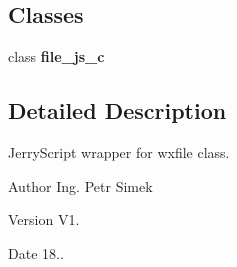 \subsection*{Classes}
\begin{DoxyCompactItemize}
\item 
class \textbf{ file\+\_\+js\+\_\+c}
\end{DoxyCompactItemize}


\subsection{Detailed Description}
Jerry\+Script wrapper for wxfile class. 

\begin{DoxyAuthor}{Author}
Ing. Petr Simek 
\end{DoxyAuthor}
\begin{DoxyVersion}{Version}
V1. 
\end{DoxyVersion}
\begin{DoxyDate}{Date}
18.. 
\end{DoxyDate}
